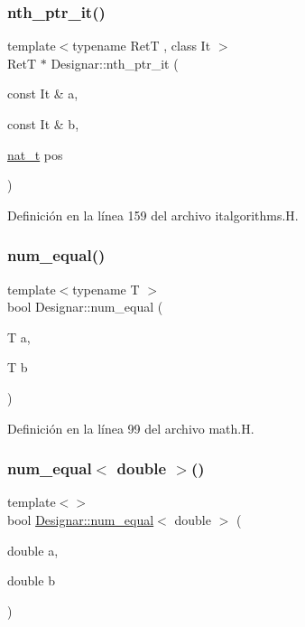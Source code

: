 \subsubsection{\texorpdfstring{nth\+\_\+ptr\+\_\+it()}{nth\_ptr\_it()}}
{\footnotesize\ttfamily template$<$typename RetT , class It $>$ \\
RetT $\ast$ Designar\+::nth\+\_\+ptr\+\_\+it (\begin{DoxyParamCaption}\item[{const It \&}]{a,  }\item[{const It \&}]{b,  }\item[{\hyperlink{namespace_designar_aa72662848b9f4815e7bf31a7cf3e33d1}{nat\+\_\+t}}]{pos }\end{DoxyParamCaption})}



Definición en la línea 159 del archivo italgorithms.\+H.

\mbox{\label{namespace_designar_ad193c81ed087e63575903c6775df36b2}} 
\subsubsection{\texorpdfstring{num\+\_\+equal()}{num\_equal()}}
{\footnotesize\ttfamily template$<$typename T $>$ \\
bool Designar\+::num\+\_\+equal (\begin{DoxyParamCaption}\item[{T}]{a,  }\item[{T}]{b }\end{DoxyParamCaption})}



Definición en la línea 99 del archivo math.\+H.

\mbox{\label{namespace_designar_abc6408777e04d2c538830bf826901317}} 
\subsubsection{\texorpdfstring{num\+\_\+equal$<$ double $>$()}{num\_equal< double >()}}
{\footnotesize\ttfamily template$<$$>$ \\
bool \hyperlink{namespace_designar_ad193c81ed087e63575903c6775df36b2}{Designar\+::num\+\_\+equal}$<$ double $>$ (\begin{DoxyParamCaption}\item[{double}]{a,  }\item[{double}]{b }\end{DoxyParamCaption})}



